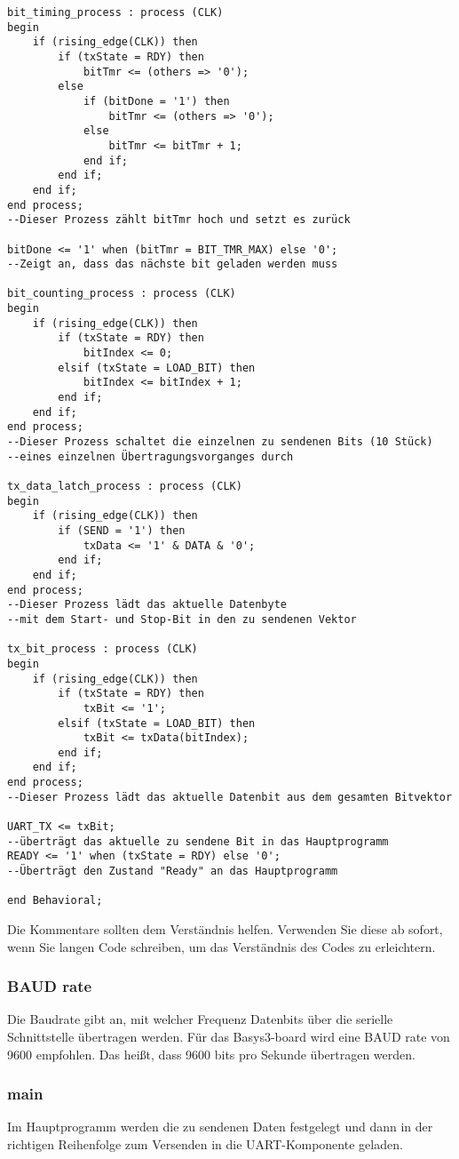 \documentclass{article}
\begin{document}
\begin{verbatim}
bit_timing_process : process (CLK)
begin
	if (rising_edge(CLK)) then
		if (txState = RDY) then
			bitTmr <= (others => '0');
		else
			if (bitDone = '1') then
				bitTmr <= (others => '0');
			else
				bitTmr <= bitTmr + 1;
			end if;
		end if;
	end if;
end process;
--Dieser Prozess zählt bitTmr hoch und setzt es zurück

bitDone <= '1' when (bitTmr = BIT_TMR_MAX) else '0';
--Zeigt an, dass das nächste bit geladen werden muss

bit_counting_process : process (CLK)
begin
	if (rising_edge(CLK)) then
		if (txState = RDY) then
			bitIndex <= 0;
		elsif (txState = LOAD_BIT) then
			bitIndex <= bitIndex + 1;
		end if;
	end if;
end process;
--Dieser Prozess schaltet die einzelnen zu sendenen Bits (10 Stück)
--eines einzelnen Übertragungsvorganges durch

tx_data_latch_process : process (CLK)
begin
	if (rising_edge(CLK)) then
		if (SEND = '1') then
			txData <= '1' & DATA & '0';
		end if;
	end if;
end process;
--Dieser Prozess lädt das aktuelle Datenbyte 
--mit dem Start- und Stop-Bit in den zu sendenen Vektor

tx_bit_process : process (CLK)
begin
	if (rising_edge(CLK)) then
		if (txState = RDY) then
			txBit <= '1';
		elsif (txState = LOAD_BIT) then
			txBit <= txData(bitIndex);
		end if;
	end if;
end process;
--Dieser Prozess lädt das aktuelle Datenbit aus dem gesamten Bitvektor

UART_TX <= txBit;
--überträgt das aktuelle zu sendene Bit in das Hauptprogramm
READY <= '1' when (txState = RDY) else '0';
--Überträgt den Zustand "Ready" an das Hauptprogramm

end Behavioral;
\end{verbatim}
\citep{DigilentSeriellesProjekt}\newline
Die Kommentare sollten dem Verst\"andnis helfen. Verwenden Sie diese ab sofort, wenn Sie langen Code schreiben, um das Verst\"andnis des Codes zu erleichtern.

\subsubsection{BAUD rate}
Die Baudrate gibt an, mit welcher Frequenz Datenbits \"uber die serielle Schnittstelle \"ubertragen werden. F\"ur das Basys3-board wird eine BAUD rate von 9600 empfohlen. Das heißt, dass 9600 bits pro Sekunde \"ubertragen werden.\citep{Baudrate}\newline


\subsubsection{main}
Im Hauptprogramm werden die zu sendenen Daten festgelegt und dann in der richtigen Reihenfolge zum Versenden in die UART-Komponente geladen.
\end{document}
